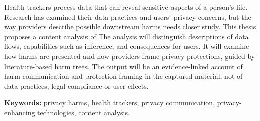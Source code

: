 Health trackers process data that can reveal sensitive aspects of
a person's life. Research has examined their data practices and users' privacy
concerns, but the way providers describe possible downstream harms needs
closer study. This thesis proposes a content analysis of 
The analysis will distinguish descriptions of data flows, capabilities such as
inference, and consequences for users. It will examine how harms are presented
and how providers frame privacy protections, guided by literature-based harm
trees.
 The output will be an
evidence-linked account of harm communication and protection framing in the
captured material, not of data practices, legal compliance or user effects.

\noindent\textbf{Keywords:} privacy harms, health trackers, privacy communication, privacy-enhancing technologies, content analysis.
